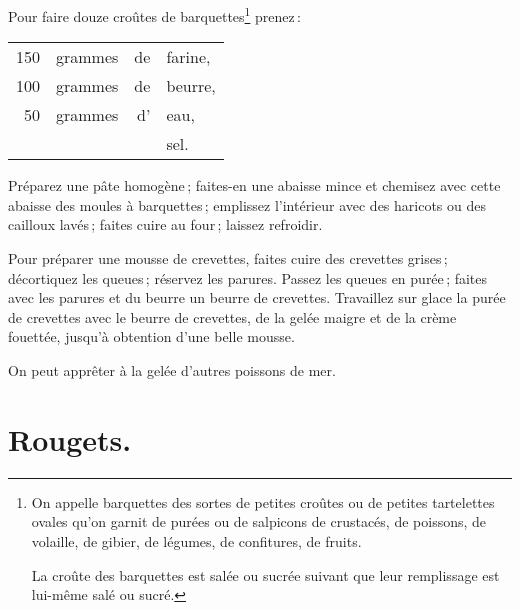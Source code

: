 \sk

Pour faire douze croûtes de barquettes\footnote{
On appelle barquettes des sortes de petites croûtes ou de petites tartelettes
ovales qu'on garnit de purées ou de salpicons de crustacés, de poissons, de
volaille, de gibier, de légumes, de confitures, de fruits.

La croûte des barquettes est salée ou sucrée suivant que leur remplissage est
lui-même salé ou sucré.} prenez :

\bigskip

\footnotesize
\begin{longtable}{rrrp{16em}}
    150 & grammes & de & farine,                                                                          \\
    100 & grammes & de & beurre,                                                                          \\
     50 & grammes & d' & eau,                                                                             \\
        &         &    & sel.                                                                             \\
\end{longtable}
\normalsize

Préparez une pâte homogène ; faites-en une abaisse mince et chemisez avec cette
abaisse des moules à barquettes ; emplissez l'intérieur avec des haricots ou
des cailloux lavés ; faites cuire au four ; laissez refroidir.

\sk

Pour préparer une mousse de crevettes, faites cuire des crevettes grises ;
décortiquez les queues ; réservez les parures. Passez les queues en purée ;
faites avec les parures et du beurre un beurre de crevettes. Travaillez sur
glace la purée de crevettes avec le beurre de crevettes, de la gelée maigre et
de la crème fouettée, jusqu'à obtention d'une belle mousse.

\sk

On peut apprêter à la gelée d’autres poissons de mer.

\section*{\centering Rougets.}

